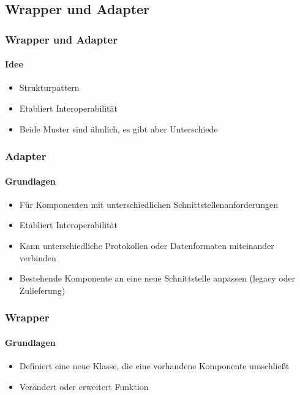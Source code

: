 \subsection{Wrapper und Adapter}
\begin{frame}
  \frametitle{Wrapper und Adapter}
  \framesubtitle{Idee}
  \begin{itemize}
    \item Strukturpattern
    \item Etabliert Interoperabilität 
    \item Beide Muster sind ähnlich, es gibt aber Unterschiede
  \end{itemize}
\end{frame}

\begin{frame}
  \frametitle{Adapter}
  \framesubtitle{Grundlagen}
  \begin{itemize}
    \item Für Komponenten mit unterschiedlichen Schnittstellenanforderungen
    \item Etabliert Interoperabilität 
    \item  Kann unterschiedliche Protokollen oder Datenformaten miteinander verbinden
    \item Bestehende Komponente an eine neue Schnittstelle anpassen (legacy oder Zulieferung)
  \end{itemize}
\end{frame}

\begin{frame}
  \frametitle{Wrapper}
  \framesubtitle{Grundlagen}
  \begin{itemize}
    \item Definiert eine neue Klasse, die eine vorhandene Komponente umschließt
    \item Verändert oder erweitert Funktion
  \end{itemize}
\end{frame}